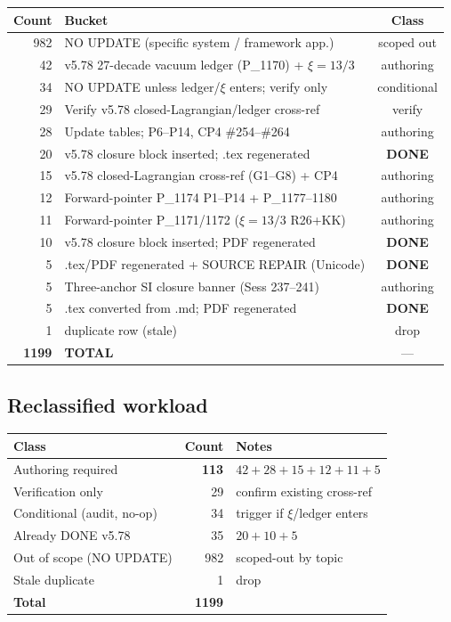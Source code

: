 \documentclass[11pt]{article}
\begin{document}
\begin{center}
\begin{tabular}{rlc}
\toprule
\textbf{Count} & \textbf{Bucket} & \textbf{Class} \\
\midrule
982 & NO UPDATE (specific system / framework app.)        & scoped out \\
 42 & v5.78 27-decade vacuum ledger (P\_1170) + $\xi=13/3$ & authoring \\
 34 & NO UPDATE unless ledger/$\xi$ enters; verify only    & conditional \\
 29 & Verify v5.78 closed-Lagrangian/ledger cross-ref      & verify \\
 28 & Update tables; P6--P14, CP4 \#254--\#264             & authoring \\
 20 & v5.78 closure block inserted; .tex regenerated       & \textbf{DONE} \\
 15 & v5.78 closed-Lagrangian cross-ref (G1--G8) + CP4     & authoring \\
 12 & Forward-pointer P\_1174 P1--P14 + P\_1177--1180      & authoring \\
 11 & Forward-pointer P\_1171/1172 ($\xi=13/3$ R26+KK)     & authoring \\
 10 & v5.78 closure block inserted; PDF regenerated        & \textbf{DONE} \\
  5 & .tex/PDF regenerated + SOURCE REPAIR (Unicode)       & \textbf{DONE} \\
  5 & Three-anchor SI closure banner (Sess 237--241)       & authoring \\
  5 & .tex converted from .md; PDF regenerated             & \textbf{DONE} \\
  1 & duplicate row (stale)                                & drop \\
\midrule
\textbf{1199} & \textbf{TOTAL} & --- \\
\bottomrule
\end{tabular}
\end{center}

\subsection{Reclassified workload}

\begin{center}
\begin{tabular}{lr l}
\toprule
\textbf{Class} & \textbf{Count} & \textbf{Notes} \\
\midrule
Authoring required          & \textbf{113} & $42+28+15+12+11+5$ \\
Verification only           &  29 & confirm existing cross-ref \\
Conditional (audit, no-op)  &  34 & trigger if $\xi$/ledger enters \\
Already DONE v5.78          &  35 & $20+10+5$ \\
Out of scope (NO UPDATE)    & 982 & scoped-out by topic \\
Stale duplicate             &   1 & drop \\
\midrule
\textbf{Total}              & \textbf{1199} & \\
\bottomrule
\end{tabular}
\end{center}
\end{document}
